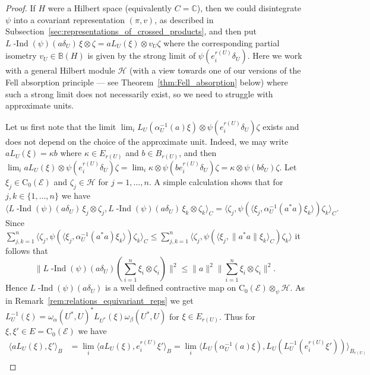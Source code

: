 \documentclass[11 pt, leqno]{amsart}
\numberwithin{equation}{section}
\theoremstyle{plain}
\theoremstyle{definition}
\newcommand*{\contz}{\mathrm{C_0}}%
\DeclareMathOperator{\dashind}{-Ind}
\renewcommand{\H}{\mathcal H}
\newcommand{\BB}{\mathbb B}
\newcommand{\EE}{\mathcal E}
\newcommand{\C}{\mathbb C}
\begin{document}
\begin{proof} 
If $H$ were a Hilbert space (equivalently $C=\C$), then we could disintegrate $\psi$ into a covariant representation $(\pi,v)$, as described in Subsection~\ref{sec:representations_of_crossed_products}, and then put $L\dashind(\psi)(a\delta_U)\, \xi\otimes \zeta =  aL_U(\xi) \otimes v_U\zeta$ where the corresponding partial isometry $v_U\in\BB(H)$ is given by the strong limit of $\psi(e_{i}^{r(U)} \delta_U)$.
Here we work with a general Hilbert module $\H$ (with a view towards one of our versions of the Fell absorption principle --- see Theorem~\ref{thm:Fell_absorption} below) where such a strong limit does not necessarily exist, so we need to struggle with approximate units. %

Let us first note that the limit $\lim_{i} L_U(\alpha_{U}^{-1}(a)\xi) \otimes \psi(e_{i}^{r(U)} \delta_U)\zeta$ exists and does not depend on the choice of the approximate unit. 
Indeed, we may write $aL_U(\xi)=\kappa b$ where $\kappa \in E_{r(U)}$ and $b\in B_{r(U)}$, and then $\lim_{i} aL_U(\xi) \otimes \psi(e_{i}^{r(U)} \delta_U)\zeta = \lim_{i} \kappa\otimes \psi(b e_{i}^{r(U)} \delta_U)\zeta = \kappa\otimes \psi(b \delta_U)\zeta$.
Let $\xi_j\in \contz(\EE)$ and $\zeta_j\in \H$ for $j=1, \ldots ,n$. 
A simple calculation shows that for $j,k \in \{1, \ldots,n\}$ we have
\[
    \langle L\dashind(\psi)(a\delta_U)\, \xi_j\otimes \zeta_j, L\dashind(\psi)(a\delta_U)\, \xi_k\otimes \zeta_k\rangle_{C} = \langle \zeta_j, \psi(\langle \xi_j, \alpha_{U}^{-1}(a^*a)\xi_k\rangle )\zeta_k\rangle_C .
\]
Since $\sum_{j,k=1}^n\langle \zeta_j, \psi(\langle \xi_j, \alpha_{U}^{-1}(a^*a)\xi_k\rangle )\zeta_k\rangle_C \leq \sum_{j,k=1}^n\langle \zeta_j, \psi(\langle \xi_j, \|a^*a\|\xi_k\rangle_C) \zeta_k \rangle$ it follows that
\[
    \Bigg\|L\dashind(\psi)(a\delta_U)\left(\sum_{i=1}^n \xi_i\otimes \zeta_i\right)\Bigg\|^2\leq \|a\|^2\Bigg\|\sum_{i=1}^n \xi_i\otimes \zeta_i\Bigg\|^2.
\]
Hence $L\dashind(\psi)(a\delta_U)$ is a well defined contractive map on $\contz(\EE)\otimes_{\psi} \H$. 
As in Remark~\ref{rem:relations_equivariant_reps} we get $L_{U}^{-1}(\xi) = \omega_{\alpha}(U^*,U)^* L_{U^*}(\xi )\omega_{\beta}(U^*,U)$ for $\xi\in E_{r(U)}$. 
Thus for $\xi, \xi'\in E=\contz(\EE)$ we have
\[
\begin{split}
    \langle aL_U(\xi) ,\xi' \rangle_{B} &= \lim_{i}\langle aL_U(\xi) ,e_{i}^{r(U)}\xi' \rangle_{B} =\lim_{i} \langle L_U(\alpha_{U}^{-1}(a)\xi) ,  L_U(L_{U}^{-1}(e_i^{r(U)}\xi')) \rangle_{B_{r(U)}} \\

\end{split}\]
\end{proof}
\end{document}
